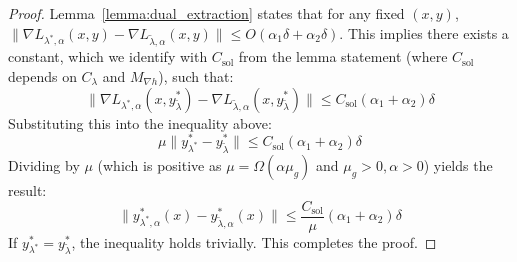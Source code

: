 \documentclass[letterpaper]{article} %
\newcommand{\1}{\mathbf{1}}
\begin{document}
\begin{proof}
Lemma~\ref{lemma:dual_extraction} states that for any fixed $(x,y)$, $\|\nabla L_{\lambda^*, \alpha}(x, y) - \nabla L_{\tilde{\lambda},\alpha}(x,y)\| \leq O(\alpha_1 \delta + \alpha_2 \delta)$. This implies there exists a constant, which we identify with $C_{\text{sol}}$ from the lemma statement (where $C_{\text{sol}}$ depends on $C_\lambda$ and $M_{\nabla h}$), such that:
$$ \|\nabla L_{\lambda^*, \alpha}(x, y^{*}_{\tilde{\lambda}}) - \nabla L_{\tilde{\lambda},\alpha}(x, y^{*}_{\tilde{\lambda}})\| \leq C_{\text{sol}}(\alpha_1 + \alpha_2)\delta $$
Substituting this into the inequality above:
$$ \mu \|y^{*}_{\lambda^*} - y^{*}_{\tilde{\lambda}}\| \leq C_{\text{sol}}(\alpha_1 + \alpha_2)\delta $$
Dividing by $\mu$ (which is positive as $\mu = \Omega(\alpha\mu_g)$ and $\mu_g > 0, \alpha >0$) yields the result:
$$ \|y^{*}_{\lambda^*,\alpha}(x) - y^{*}_{\tilde{\lambda},\alpha}(x)\| \leq \frac{C_{\text{sol}}}{\mu}(\alpha_1 + \alpha_2)\delta $$
If $y^{*}_{\lambda^*} = y^{*}_{\tilde{\lambda}}$, the inequality holds trivially. This completes the proof.
\end{proof}
\end{document}
